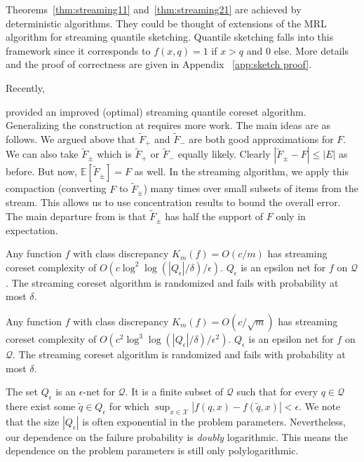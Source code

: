 \documentclass[anon,12pt]{colt2019} %
\newcommand{\E}{\mathbb{E}}
\newcommand{\eps}{\epsilon}
\newcommand{\X}{\mathcal{X}}
\newcommand{\Q}{\mathcal{Q}}
\begin{document}
Theorems~\ref{thm:streaming11} and~\ref{thm:streaming21} are achieved by deterministic algorithms. 
They could be thought of extensions of the MRL algorithm \cite{MRL} for streaming quantile sketching. 
Quantile sketching falls into this framework since it corresponds to $f(x,q) = 1$ if $x>q$ and $0$ else. 
More details and the proof of correctness are given in Appendix ~\ref{app:sketch proof}.

Recently, {\cite{DBLP:conf/focs/KarninLL16} provided an improved (optimal) streaming quantile coreset algorithm. 
Generalizing the construction at  \cite{DBLP:conf/focs/KarninLL16} requires more work. 
The main ideas are as follows. 
We argued above that $\tilde F_{+}$ and $\tilde F_{-}$ are both good approximations for $F$. 
We can also take $\tilde F_{\pm}$ which is $\tilde F_{+}$ or $\tilde F_{-}$ equally likely. 
Clearly $|\tilde F_{\pm} - F| \le |E|$ as before. But now, $\E[\tilde F_{\pm}] = F$ as well. 
In the streaming algorithm, we apply this compaction (converting $F$ to $\tilde F_{\pm}$) many times over small subsets of items from the stream. This allows us to use concentration results to bound the overall error. 
The main departure from \cite{DBLP:conf/focs/KarninLL16} is that $\tilde F_{\pm}$ has half the support of $F$ only in expectation.

\begin{theorem} \label{thm:streaming12}
Any function $f$ with class discrepancy $K_m(f) = O(c/m)$ has streaming coreset complexity of $O\left(c\log^2\log(|Q_\eps|/\delta)/\eps\right)$.
$Q_\eps$ is an epsilon net for $f$ on $\Q$. 
The streaming coreset algorithm is randomized and fails with probability at most $\delta$.
\end{theorem}

\begin{theorem} \label{thm:streaming22}
Any function $f$ with class discrepancy $K_m(f) = O(c/\sqrt{m})$ has streaming coreset complexity of $O\left(c^2\log^3\log(|Q_\eps|/\delta) /\eps^2\right)$.
$Q_\eps$ is an epsilon net for $f$ on $\Q$. 
The streaming coreset algorithm is randomized and fails with probability at most $\delta$.
\end{theorem}

The set $Q_\eps$ is an $\eps$-net for $\Q$. 
It is a finite subset of $\Q$ such that for every $q \in \Q$ there exist some $\tilde{q} \in Q_\eps$ for which $\sup_{x \in \X} |f(q,x) - f(\tilde{q},x)| < \eps$. 
We note that the size $|Q_\eps|$ is often exponential in the problem parameters. 
Nevertheless, our dependence on the failure probability is \emph{doubly} logarithmic. 
This means the dependence on the problem parameters is still only polylogarithmic.

}
\end{document}
